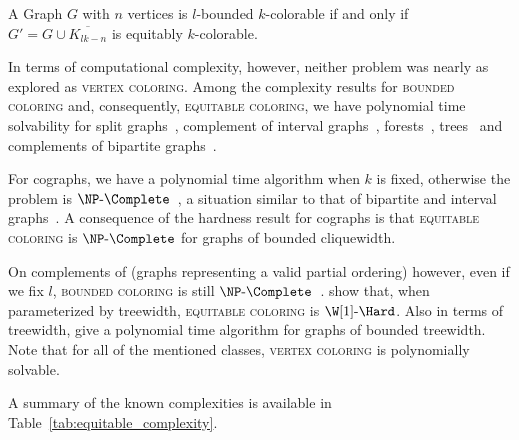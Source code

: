 \begin{observation*}
    A Graph $G$ with $n$ vertices is $l$-bounded $k$-colorable if and only if $G' = G \cup \overline{K_{lk - n}}$ is equitably $k$-colorable.
\end{observation*}


In terms of computational complexity, however, neither problem was nearly as explored as \textsc{vertex coloring}.
Among the complexity results for \textsc{bounded coloring} and, consequently, \textsc{equitable coloring}, we have polynomial time solvability for split graphs~\citep{equitable_split}, complement of interval graphs~\citep{graph_partitioning1}, forests~\citep{mutual_exclusion_scheduling}, trees~\citep{equitable_trees} and complements of bipartite graphs~\citep{graph_partitioning1}.

For cographs, we have a polynomial time algorithm when $k$ is fixed, otherwise the problem is $\NPc$~\citep{graph_partitioning1}, a situation similar to that of bipartite and interval graphs~\citep{graph_partitioning1}.
A consequence of the hardness result for cographs is that \textsc{equitable coloring} is $\NPc$ for graphs of bounded cliquewidth.

On complements of  (graphs representing a valid partial ordering) however, even if we fix $l$, \textsc{bounded coloring} is still $\NPc$~\citep{chain_antichain}.
\citep{colorful_treewidth} show that, when parameterized by treewidth, \textsc{equitable coloring} is $\W[1]\text{-}\Hard$.
Also in terms of treewidth, \citep{equitable_treewidth} give a polynomial time algorithm for graphs of bounded treewidth.
Note that for all of the mentioned classes, \textsc{vertex coloring} is polynomially solvable.

A summary of the known complexities is available in Table~\ref{tab:equitable_complexity}.



